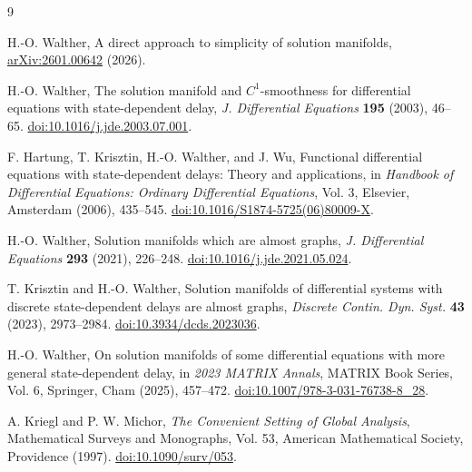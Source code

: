 \documentclass[11pt]{article}
\begin{document}
\begin{thebibliography}{9}

H.-O. Walther,
A direct approach to simplicity of solution manifolds,
\href{https://arxiv.org/abs/2601.00642}
{arXiv:2601.00642} (2026).

H.-O. Walther,
The solution manifold and $C^1$-smoothness for
differential equations with state-dependent delay,
\emph{J. Differential Equations}
\textbf{195} (2003), 46--65.
\href{https://doi.org/10.1016/j.jde.2003.07.001}
{doi:10.1016/j.jde.2003.07.001}.

F. Hartung, T. Krisztin, H.-O. Walther, and J. Wu,
Functional differential equations with state-dependent
delays: Theory and applications,
in \emph{Handbook of Differential Equations:
Ordinary Differential Equations}, Vol. 3,
Elsevier, Amsterdam (2006), 435--545.
\href{https://doi.org/10.1016/S1874-5725(06)80009-X}
{doi:10.1016/S1874-5725(06)80009-X}.

H.-O. Walther,
Solution manifolds which are almost graphs,
\emph{J. Differential Equations}
\textbf{293} (2021), 226--248.
\href{https://doi.org/10.1016/j.jde.2021.05.024}
{doi:10.1016/j.jde.2021.05.024}.

T. Krisztin and H.-O. Walther,
Solution manifolds of differential systems with
discrete state-dependent delays are almost graphs,
\emph{Discrete Contin. Dyn. Syst.}
\textbf{43} (2023), 2973--2984.
\href{https://doi.org/10.3934/dcds.2023036}
{doi:10.3934/dcds.2023036}.

H.-O. Walther,
On solution manifolds of some differential equations
with more general state-dependent delay,
in \emph{2023 MATRIX Annals},
MATRIX Book Series, Vol. 6,
Springer, Cham (2025), 457--472.
\href{https://doi.org/10.1007/978-3-031-76738-8_28}
{doi:10.1007/978-3-031-76738-8_28}.

A. Kriegl and P. W. Michor,
\emph{The Convenient Setting of Global Analysis},
Mathematical Surveys and Monographs, Vol. 53,
American Mathematical Society, Providence (1997).
\href{https://doi.org/10.1090/surv/053}
{doi:10.1090/surv/053}.

\end{thebibliography}
\end{document}
